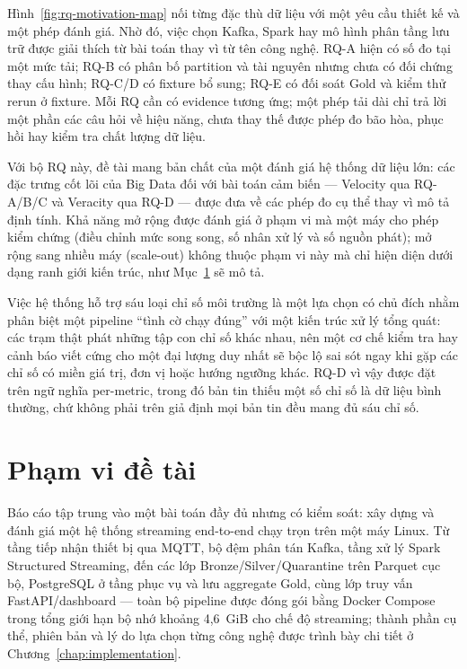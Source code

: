 

Hình~\ref{fig:rq-motivation-map} nối từng đặc thù dữ liệu với một yêu cầu
thiết kế và một phép đánh giá. Nhờ đó, việc chọn Kafka, Spark hay mô hình
phân tầng lưu trữ được giải thích từ bài toán thay vì từ tên công nghệ.
RQ-A hiện có số đo tại một mức tải; RQ-B có phân bố partition và tài
nguyên nhưng chưa có đối chứng thay cấu hình; RQ-C/D có fixture bổ sung;
RQ-E có đối soát Gold và kiểm thử rerun ở fixture. Mỗi RQ cần có evidence tương ứng; một phép tải dài chỉ trả lời một phần
các câu hỏi về hiệu năng, chưa thay thế được phép đo bão hòa, phục hồi hay
kiểm tra chất lượng dữ liệu.

Với bộ RQ này, đề tài mang bản chất của một đánh giá hệ thống dữ liệu lớn:
các đặc trưng cốt lõi của Big Data đối với bài toán cảm biến --- Velocity
qua RQ-A/B/C và Veracity qua RQ-D --- được đưa về các phép đo cụ thể thay
vì mô tả định tính. Khả năng mở rộng được đánh giá ở phạm vi mà một
máy cho phép kiểm chứng (điều chỉnh mức song song, số nhân xử lý và số
nguồn phát); mở rộng sang nhiều máy (scale-out) không thuộc phạm vi này mà
chỉ hiện diện dưới dạng ranh giới kiến trúc, như Mục~\ref{sec:scope} sẽ
mô tả.

Việc hệ thống hỗ trợ sáu loại chỉ số môi trường là một lựa chọn có chủ đích
nhằm phân biệt một pipeline ``tình cờ chạy đúng'' với một kiến trúc xử lý
tổng quát: các trạm thật phát những tập con chỉ số khác nhau, nên một cơ chế
kiểm tra hay cảnh báo viết cứng cho một đại lượng duy nhất sẽ bộc lộ sai sót
ngay khi gặp các chỉ số có miền giá trị, đơn vị hoặc hướng ngưỡng khác.
RQ-D vì vậy được đặt trên ngữ nghĩa per-metric, trong đó bản tin thiếu một
số chỉ số là dữ liệu bình thường, chứ không phải trên giả định mọi bản tin
đều mang đủ sáu chỉ số.

\section{Phạm vi đề tài}
\label{sec:scope}

Báo cáo tập trung vào một bài toán đầy đủ nhưng có kiểm soát: xây dựng
và đánh giá một hệ thống streaming end-to-end chạy trọn trên một máy
Linux. Từ tầng tiếp nhận thiết bị qua MQTT, bộ đệm phân tán Kafka, tầng
xử lý Spark Structured Streaming, đến các lớp Bronze/Silver/Quarantine
trên Parquet cục bộ, PostgreSQL ở tầng phục vụ và lưu aggregate Gold, cùng
lớp truy vấn FastAPI/dashboard --- toàn bộ pipeline được đóng gói bằng
Docker Compose trong tổng giới hạn bộ nhớ khoảng 4,6~GiB cho chế độ
streaming; thành phần cụ thể, phiên bản và lý do lựa chọn từng công nghệ
được trình bày chi tiết ở Chương~\ref{chap:implementation}.

